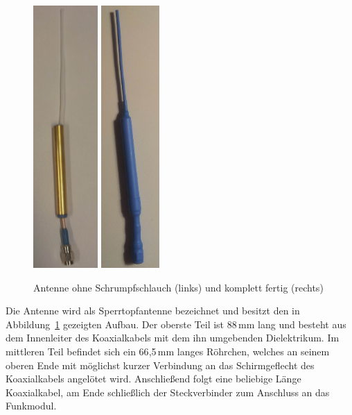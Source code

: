 \documentclass[pdftex, parskip, numbers=noenddot, toc=listof]{scrbook}
\begin{document}
			\begin{figure}
				\centering
				\includegraphics[height=10cm]{Bilder/Antenne}%
				\includegraphics[height=10cm]{Bilder/AntenneKomplett}
				\caption{Antenne ohne Schrumpfschlauch (links) und komplett fertig (rechts)}
				\label{fig:antenne}
			\end{figure}

			Die Antenne wird als Sperrtopfantenne bezeichnet und besitzt den in Abbildung~\ref{fig:antenne} gezeigten Aufbau. Der oberste Teil ist 88\,mm lang und besteht aus dem Innenleiter des Koaxialkabels mit dem ihn umgebenden Dielektrikum. Im mittleren Teil befindet sich ein 66{,}5\,mm langes Röhrchen, welches an seinem oberen Ende mit möglichst kurzer Verbindung an das Schirmgeflecht des Koaxialkabels angelötet wird. Anschließend folgt eine beliebige Länge Koaxialkabel, am Ende schließlich der Steckverbinder zum Anschluss an das Funkmodul.
\end{document}
